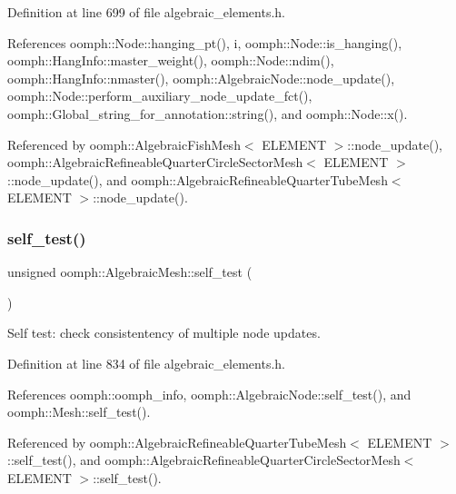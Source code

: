 Definition at line 699 of file algebraic\+\_\+elements.\+h.



References oomph\+::\+Node\+::hanging\+\_\+pt(), i, oomph\+::\+Node\+::is\+\_\+hanging(), oomph\+::\+Hang\+Info\+::master\+\_\+weight(), oomph\+::\+Node\+::ndim(), oomph\+::\+Hang\+Info\+::nmaster(), oomph\+::\+Algebraic\+Node\+::node\+\_\+update(), oomph\+::\+Node\+::perform\+\_\+auxiliary\+\_\+node\+\_\+update\+\_\+fct(), oomph\+::\+Global\+\_\+string\+\_\+for\+\_\+annotation\+::string(), and oomph\+::\+Node\+::x().



Referenced by oomph\+::\+Algebraic\+Fish\+Mesh$<$ E\+L\+E\+M\+E\+N\+T $>$\+::node\+\_\+update(), oomph\+::\+Algebraic\+Refineable\+Quarter\+Circle\+Sector\+Mesh$<$ E\+L\+E\+M\+E\+N\+T $>$\+::node\+\_\+update(), and oomph\+::\+Algebraic\+Refineable\+Quarter\+Tube\+Mesh$<$ E\+L\+E\+M\+E\+N\+T $>$\+::node\+\_\+update().

\mbox{\label{classoomph_1_1AlgebraicMesh_adfac67a6cb78db3955e20a241f2f4df4}} 
\subsubsection{\texorpdfstring{self\+\_\+test()}{self\_test()}}
{\footnotesize\ttfamily unsigned oomph\+::\+Algebraic\+Mesh\+::self\+\_\+test (\begin{DoxyParamCaption}{ }\end{DoxyParamCaption})\hspace{0.3cm}{\ttfamily [inline]}}



Self test\+: check consistentency of multiple node updates. 



Definition at line 834 of file algebraic\+\_\+elements.\+h.



References oomph\+::oomph\+\_\+info, oomph\+::\+Algebraic\+Node\+::self\+\_\+test(), and oomph\+::\+Mesh\+::self\+\_\+test().



Referenced by oomph\+::\+Algebraic\+Refineable\+Quarter\+Tube\+Mesh$<$ E\+L\+E\+M\+E\+N\+T $>$\+::self\+\_\+test(), and oomph\+::\+Algebraic\+Refineable\+Quarter\+Circle\+Sector\+Mesh$<$ E\+L\+E\+M\+E\+N\+T $>$\+::self\+\_\+test().


